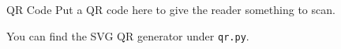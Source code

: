 \documentclass{purdue-poster}
\begin{document}
\begin{frame}{}
\begin{columns}[c]
\begin{column}{.48\linewidth}
    \begin{block}{\large QR Code}
        Put a QR code here to give the reader something to scan.

        You can find the SVG QR generator under \texttt{qr.py}.

        \begin{figure}
            {\centering}
        \end{figure}
    \end{block}
    \end{column}
    \end{columns}
    \vfill
\end{frame}
\end{document}
